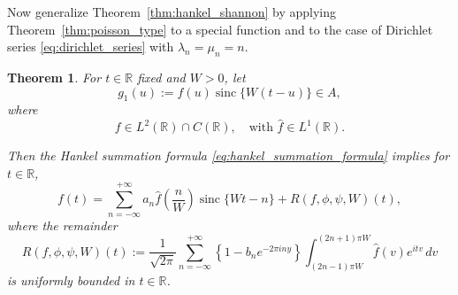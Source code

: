 \documentclass[11pt]{article}
\theoremstyle{plain}
\newtheorem{theorem}{Theorem}
\begin{document}
Now generalize Theorem~\ref{thm:hankel_shannon} by applying Theorem~\ref{thm:poisson_type} to a special function and to the case of Dirichlet series \eqref{eq:dirichlet_series} with $\lambda_n = \mu_n = n$.

\begin{theorem}
\label{thm:riemann_hankel}
For $t \in \mathbb{R}$ fixed and $W > 0$, let
\begin{equation}
g_1(u) := f(u) \operatorname{sinc}\{W(t-u)\} \in A,
\label{eq:riemann_hankel_setup}
\end{equation}
where
\begin{equation}
f \in L^2(\mathbb{R}) \cap C(\mathbb{R}), \quad \text{with } \hat{f} \in L^1(\mathbb{R}).
\label{eq:riemann_hankel_condition}
\end{equation}

Then the Hankel summation formula \eqref{eq:hankel_summation_formula} implies for $t \in \mathbb{R}$,
\begin{equation}
f(t) = \sum_{n=-\infty}^{+\infty} a_n \hat{f}\left(\frac{n}{W}\right) \operatorname{sinc}\{Wt - n\} + R(f, \phi, \psi, W)(t),
\label{eq:riemann_hankel_result}
\end{equation}
where the remainder
\begin{equation}
R(f, \phi, \psi, W)(t) := \frac{1}{\sqrt{2\pi}} \sum_{n=-\infty}^{+\infty} \left\{1 - b_n e^{-2\pi i n y}\right\} \int_{(2n-1)\pi W}^{(2n+1)\pi W} \hat{f}(v) e^{itv} \, dv
\label{eq:remainder_formula}
\end{equation}
is uniformly bounded in $t \in \mathbb{R}$.
\end{theorem}
\end{document}
